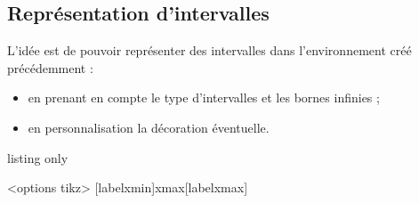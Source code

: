 \begin{PresCodePL}{}
\begin{RepIntervalles}[Unite=1,xmin=-2,xmax=8,Graduations={-2,-1,...,8},GraduationsAlt={0,5}]
\end{RepIntervalles}
\end{PresCodePL}

\begin{PresCodePL}{}
\begin{RepIntervalles}[Elargir=0.025,xmin=-100,xmax=200,Unite=auto,Largeur=10, Graduations={-100,-90,...,200},GraduationsAlt={-100,-50,...,200}, Valeurs={-100,-50,...,200},Police=\scriptsize]
\end{RepIntervalles}
\end{PresCodePL}

\subsection{Représentation d'intervalles}

\begin{tipblock}
L'idée est de pouvoir représenter des intervalles dans l'environnement créé précédemment :

\begin{itemize}
	\item en prenant en compte le type d'intervalles et les bornes infinies ;
	\item en personnalisation la décoration éventuelle.
\end{itemize}
\vspace*{-\baselineskip}\leavevmode
\end{tipblock}

\begin{PresCodeTexPL}{listing only}
\begin{RepIntervalles}[clés]<options tikz>
	[labelxmin]{xmax}[labelxmax]
\end{RepIntervalles}
\end{PresCodeTexPL}

